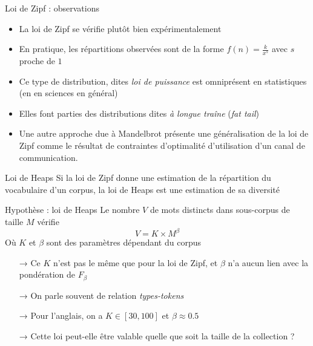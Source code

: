 \documentclass[hyperref={unicode}, xcolor={svgnames}, french]{beamer}
\begin{document}
\begin{frame}{Loi de Zipf : observations}
    \begin{itemize}
        \item La loi de Zipf se vérifie plutôt bien expérimentalement
        \item En pratique, les répartitions observées sont de la forme $f(n)=\frac{k}{x^s}$ avec $s$ proche de $1$
        \item Ce type de distribution, dites \emph{loi de puissance} est omniprésent en statistiques (en en sciences en général)
        \item Elles font parties des distributions dites \emph{à longue traîne} (\textit{fat tail})
        \item Une autre approche due à Mandelbrot présente une généralisation de la loi de Zipf comme le résultat de contraintes d'optimalité d'utilisation d'un canal de communication.
    \end{itemize}
\end{frame}

\begin{frame}{Loi de Heaps}
    Si la loi de Zipf donne une estimation de la répartition du vocabulaire d'un corpus, la loi de Heaps est une estimation de sa diversité
    \begin{block}{Hypothèse : loi de Heaps}
        Le nombre $V$ de mots distincts dans sous-corpus de taille $M$ vérifie
        \begin{equation}
            V = K×M^β
        \end{equation}
        Où $K$ et $β$ sont des paramètres dépendant du corpus
    \end{block}
    \begin{itemize}
        \item[→] Ce $K$ n'est pas le même que pour la loi de Zipf, et $β$ n'a aucun lien avec la pondération de $F_β$
        \item[→] On parle souvent de relation \emph{types-tokens}
        \item[→] Pour l'anglais, on a $K∈[30, 100]$ et $β≈0.5$
        \item[→] Cette loi peut-elle être valable quelle que soit la taille de la collection ?
    \end{itemize}
\end{frame}
\end{document}
